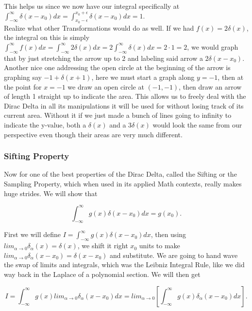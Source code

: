 \documentclass[12pt]{article}
\begin{document}
This helps us since we now have our integral specifically at $\int_{-\infty}^{\infty} \delta(x-x_0)dx=\int_{x_0-\epsilon}^{x_0+\epsilon} \delta(x-x_0)dx=1$. \\

Realize what other Transformations would do as well. If we had $f(x)=2\delta(x)$, the integral on this is simply $\int_{-\infty}^{\infty} f(x)dx=\int_{-\infty}^{\infty} 2\delta(x)dx=2\int_{-\infty}^{\infty} \delta(x)dx=2\cdot1=2$, we would graph that by just stretching the arrow up to 2 and labeling said arrow a $2\delta(x-x_0)$. Another nice one addressing the open circle at the beginning of the arrow is graphing say $-1+\delta(x+1)$, here we must start a graph along $y=-1$, then at the point for $x=-1$ we draw an open circle at $(-1,-1)$, then draw an arrow of length 1 straight up to indicate the area. This allows us to freely deal with the Dirac Delta in all its manipulations it will be used for without losing track of its current area. Without it if we just made a bunch of lines going to infinity to indicate the y-value, both a $\delta(x)$ and a $3\delta(x)$ would look the same from our perspective even though their areas are very much different.

\subsubsection{Sifting Property}

Now for one of the best properties of the Dirac Delta, called the Sifting or the Sampling Property, which when used in its applied Math contexts, really makes huge strides. We will show that

\begin{equation*}
    \int_{-\infty}^{\infty} g(x)\delta(x-x_0) dx = g(x_0).
\end{equation*}

First we will define $I=\int_{-\infty}^{\infty} g(x)\delta(x-x_0) dx$, then using $lim_{\alpha\rightarrow0} \delta_{\alpha}(x)=\delta(x)$, we shift it right $x_0$ units to make $lim_{\alpha\rightarrow0} \delta_{\alpha}(x-x_0)=\delta(x-x_0)$ and substitute. We are going to hand wave the swap of limits and integrals, which was the Leibniz Integral Rule, like we did way back in the Laplace of a polynomial section. We will then get

\begin{equation*}
    I=\int_{-\infty}^{\infty} g(x)lim_{\alpha\rightarrow0} \delta_{\alpha}(x-x_0) dx = lim_{\alpha\rightarrow0} \left[\int_{-\infty}^{\infty} g(x) \delta_{\alpha}(x-x_0) dx\right].
\end{equation*}
\end{document}
